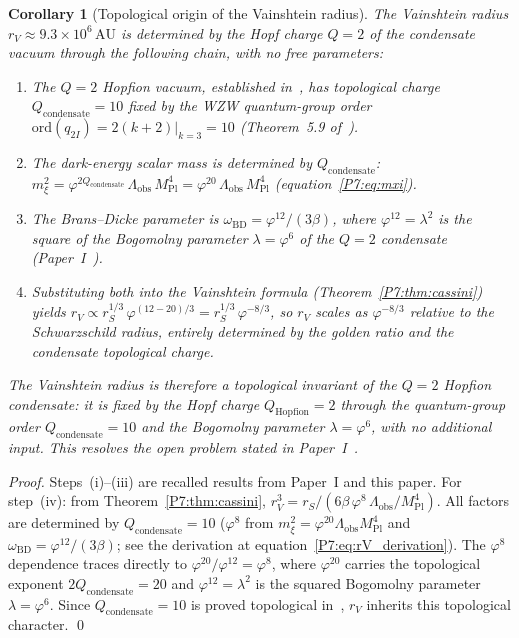 \documentclass[11pt,a4paper]{article}
\newtheorem{corollary}[theorem]{Corollary}
\theoremstyle{definition}
\theoremstyle{remark}
\newcommand{\vp}{\varphi}
\newcommand{\lam}{\lambda}
\newcommand{\MPl}{M_{\mathrm{Pl}}}
\newcommand{\Lobs}{\Lambda_{\mathrm{obs}}}
\newcommand{\oBD}{\omega_{\mathrm{BD}}}
\begin{document}
\begin{corollary}[Topological origin of the Vainshtein radius]
\label{P7:cor:vainshtein_topology}
The Vainshtein radius $r_V\approx9.3\times10^6\,\mathrm{AU}$ is
determined by the Hopf charge $Q=2$ of the condensate vacuum through
the following chain, with no free parameters:
\begin{enumerate}[noitemsep,label=\emph{(\roman*)}]
\item The $Q=2$ Hopfion vacuum, established in~\cite{Paper1}, has
  topological charge $Q_{\mathrm{condensate}}=10$ fixed by the
  WZW quantum-group order $\mathrm{ord}(q_{2I})=2(k+2)|_{k=3}=10$
  (Theorem~5.9 of~\cite{Paper1}).
\item The dark-energy scalar mass is determined by $Q_{\mathrm{condensate}}$:
  $m_\xi^2 = \vp^{2Q_{\mathrm{condensate}}}\,\Lobs\,\MPl^4
  = \vp^{20}\,\Lobs\,\MPl^4$ (equation~\eqref{P7:eq:mxi}).
\item The Brans--Dicke parameter is $\oBD=\vp^{12}/(3\beta)$,
  where $\vp^{12}=\lam^2$ is the square of the Bogomolny parameter
  $\lam=\vp^6$ of the $Q=2$ condensate (Paper~I~\cite{Paper1}).
\item Substituting both into the Vainshtein formula (Theorem~\ref{P7:thm:cassini})
  yields $r_V\propto r_S^{1/3}\,\vp^{(12-20)/3}=r_S^{1/3}\,\vp^{-8/3}$,
  so $r_V$ scales as $\vp^{-8/3}$ relative to the Schwarzschild radius,
  entirely determined by the golden ratio and the condensate topological charge.
\end{enumerate}
The Vainshtein radius is therefore a topological invariant of the $Q=2$
Hopfion condensate: it is fixed by the Hopf charge $Q_{\mathrm{Hopfion}}=2$
through the quantum-group order $Q_{\mathrm{condensate}}=10$ and the
Bogomolny parameter $\lam=\vp^6$, with no additional input.
This resolves the open problem stated in Paper~I~\cite{Paper1}.
\end{corollary}

\begin{proof}
Steps~(i)--(iii) are recalled results from Paper~I and this paper.
For step~(iv): from Theorem~\ref{P7:thm:cassini},
$r_V^3 = r_S/(6\beta\,\vp^8\,\Lobs/\MPl^4)$.
All factors are determined by $Q_{\mathrm{condensate}}=10$ ($\vp^8$
from $m_\xi^2=\vp^{20}\Lobs\MPl^4$ and $\oBD=\vp^{12}/(3\beta)$;
see the derivation at equation~\eqref{P7:eq:rV_derivation}).
The $\vp^8$ dependence traces directly to $\vp^{20}/\vp^{12}=\vp^8$,
where $\vp^{20}$ carries the topological exponent $2Q_{\mathrm{condensate}}=20$
and $\vp^{12}=\lam^2$ is the squared Bogomolny parameter $\lam=\vp^6$.
Since $Q_{\mathrm{condensate}}=10$ is proved topological in~\cite{Paper1},
$r_V$ inherits this topological character.
\qed
\end{proof}
\end{document}
